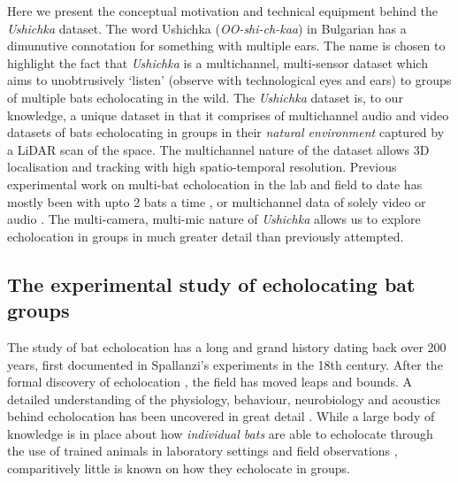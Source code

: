 \documentclass[
]{book}
\begin{document}
Here we present the conceptual motivation and technical equipment behind the \emph{Ushichka} dataset. The word Ushichka (\emph{OO-shi-ch-kaa}) in Bulgarian has a dimunutive connotation for something with multiple ears. The name is chosen to highlight the fact that \emph{Ushichka} is a multichannel, multi-sensor dataset which aims to unobtrusively `listen' (observe with technological eyes and ears) to groups of multiple bats echolocating in the wild. The \emph{Ushichka} dataset is, to our knowledge, a unique dataset in that it comprises of multichannel audio and video datasets of bats echolocating in groups in their \emph{natural environment} captured by a LiDAR scan of the space. The multichannel nature of the dataset allows 3D localisation and tracking with high spatio-temporal resolution. Previous experimental work on multi-bat echolocation in the lab and field to date has mostly been with upto 2 bats a time \citep{goetze2016a, giuggioli2015a, necknig2011between, fawcett2015clutter, fawcett2015echolocation}, or multichannel data of solely video or audio \citep{theriault2010a, lin2016a}. The multi-camera, multi-mic nature of \emph{Ushichka} allows us to explore echolocation in groups in much greater detail than previously attempted.

\hypertarget{the-experimental-study-of-echolocating-bat-groups}{%
\subsection{The experimental study of echolocating bat groups}\label{the-experimental-study-of-echolocating-bat-groups}}

The study of bat echolocation has a long and grand history dating back over 200 years, first documented in Spallanzi's experiments in the 18th century.
After the formal discovery of echolocation \citep{griffin1958a, Dijkgraaf1946}, the field has moved leaps and bounds. A detailed understanding of the physiology, behaviour, neurobiology and acoustics behind echolocation has been uncovered in great detail \citep{popper1995hearing, Fenton2016}. While a large body of knowledge is in place about how \emph{individual bats} are able to echolocate through the use of trained animals in laboratory settings and field observations \citep{Fenton2016}, comparitively little is known on how they echolocate in groups\citep{ulanovsky2008bat}.
\end{document}
